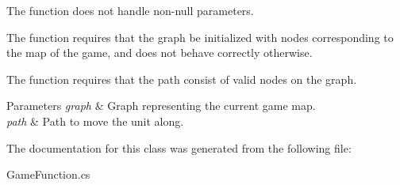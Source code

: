 \begin{DoxyItemize}
\item The function does not handle non-\/null parameters.
\item The function requires that the graph be initialized with nodes corresponding to the map of the game, and does not behave correctly otherwise.
\item The function requires that the path consist of valid nodes on the graph. 
\begin{DoxyParams}{Parameters}
{\em graph} & Graph representing the current game map. \\
\hline
{\em path} & Path to move the unit along. \\
\hline
\end{DoxyParams}

\end{DoxyItemize}

The documentation for this class was generated from the following file\+:\begin{DoxyCompactItemize}
\item 
Game\+Function.\+cs\end{DoxyCompactItemize}
